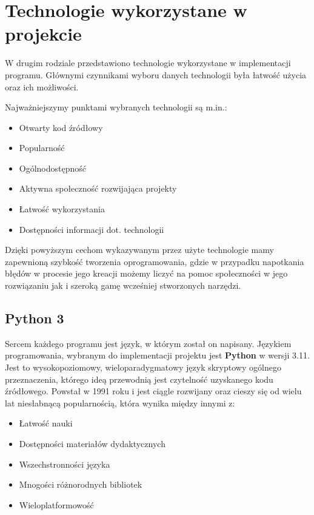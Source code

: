 \chapter{Technologie wykorzystane w projekcie}

W drugim rodziale przedstawiono technologie wykorzystane w implementacji programu. Głównymi czynnikami wyboru danych technologii była łatwość użycia oraz ich możliwości.

Najważniejszymy punktami wybranych technologii są m.in.:
\begin{itemize}
	\item Otwarty kod źródłowy
	\item Popularność
	\item Ogólnodostępność
	\item Aktywna społeczność rozwijająca projekty
	\item Łatwość wykorzystania
	\item Dostępności informacji dot. technologii
\end{itemize}

Dzięki powyższym cechom wykazywanym przez użyte technologie mamy zapewnioną szybkość tworzenia oprogramowania, gdzie w przypadku napotkania błędów w procesie jego kreacji możemy liczyć na pomoc społeczności w jego rozwiązaniu jak i szeroką gamę wcześniej stworzonych narzędzi.



\section{Python 3}
Sercem każdego programu jest język, w którym został on napisany. Językiem programowania, wybranym do implementacji projektu jest \textbf{Python} w wersji 3.11.
Jest to wysokopoziomowy, wieloparadygmatowy język skryptowy ogólnego przeznaczenia, którego ideą przewodnią jest czytelność uzyskanego kodu źródłowego. Powstał w 1991 roku i jest ciągle rozwijany oraz cieszy się od wielu lat niesłabnącą popularnością, która wynika między innymi z:

\begin{itemize}
	\item Łatwość nauki
	\item Dostępności materiałów dydaktycznych
	\item Wszechstronności języka
	\item Mnogości różnorodnych bibliotek
	\item Wieloplatformowość
\end{itemize}

